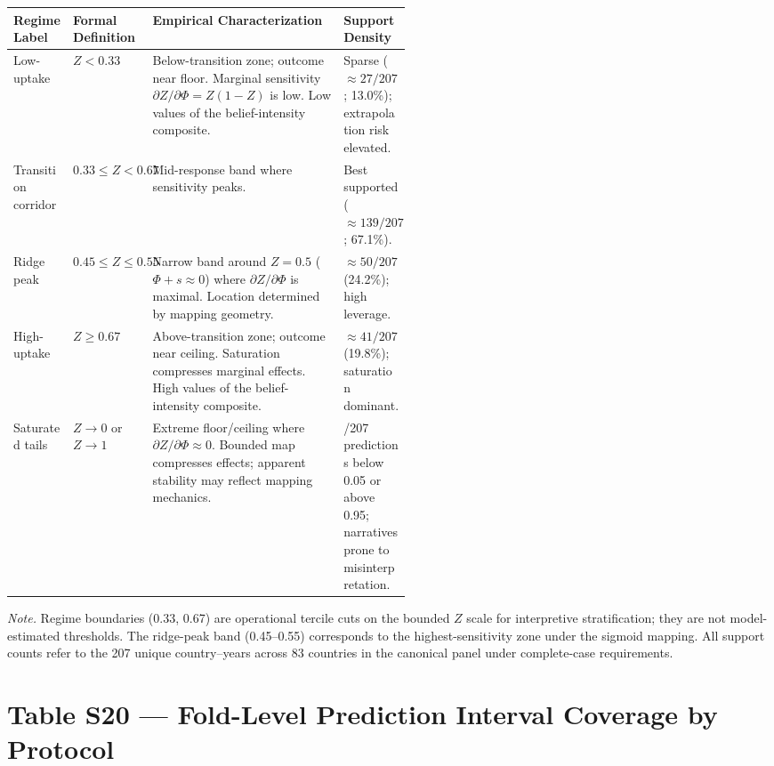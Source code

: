 \documentclass[11pt]{article}
\begin{document}
\begingroup
\small
\renewcommand{\arraystretch}{1.30}
\begin{tabularx}{\linewidth}{@{}>{\raggedright\arraybackslash}p{0.15\linewidth} >{\raggedright\arraybackslash}p{0.20\linewidth} >{\raggedright\arraybackslash}X >{\raggedright\arraybackslash}p{0.17\linewidth}@{}}
\toprule
Regime Label & Formal Definition & Empirical Characterization & Support Density \\
\midrule
Low-uptake & $Z < 0.33$ & Below-transition zone; outcome near floor. Marginal sensitivity $\partial Z/\partial\Phi = Z(1{-}Z)$ is low. Low values of the belief-intensity composite. & Sparse (${\approx}27/207$; 13.0\%); extrapolation risk elevated. \\
\addlinespace
Transition corridor & $0.33 \leq Z < 0.67$ & Mid-response band where sensitivity peaks. & Best supported (${\approx}139/207$; 67.1\%). \\
\addlinespace
Ridge peak & $0.45 \leq Z \leq 0.55$ & Narrow band around $Z{=}0.5$ ($\Phi{+}s \approx 0$) where $\partial Z/\partial\Phi$ is maximal. Location determined by mapping geometry. & ${\approx}50/207$ (24.2\%); high leverage. \\
\addlinespace
High-uptake & $Z \geq 0.67$ & Above-transition zone; outcome near ceiling. Saturation compresses marginal effects. High values of the belief-intensity composite. & ${\approx}41/207$ (19.8\%); saturation dominant. \\
\addlinespace
Saturated tails & $Z \to 0$ or $Z \to 1$ & Extreme floor/ceiling where $\partial Z/\partial\Phi \approx 0$. Bounded map compresses effects; apparent stability may reflect mapping mechanics. & 0/207 predictions below 0.05 or above 0.95; narratives prone to misinterpretation. \\
\bottomrule
\end{tabularx}
\endgroup

\vspace{6pt}
\noindent\justifying\small
\textit{Note.} Regime boundaries (0.33, 0.67) are operational tercile cuts on the bounded $Z$ scale for interpretive stratification; they are not model-estimated thresholds.
The ridge-peak band (0.45--0.55) corresponds to the highest-sensitivity zone under the sigmoid mapping.
All support counts refer to the 207 unique country--years across 83 countries in the canonical panel under complete-case requirements.

\section*{Table S20 --- Fold-Level Prediction Interval Coverage by Protocol}
\label{sec:table_s20}
\end{document}
